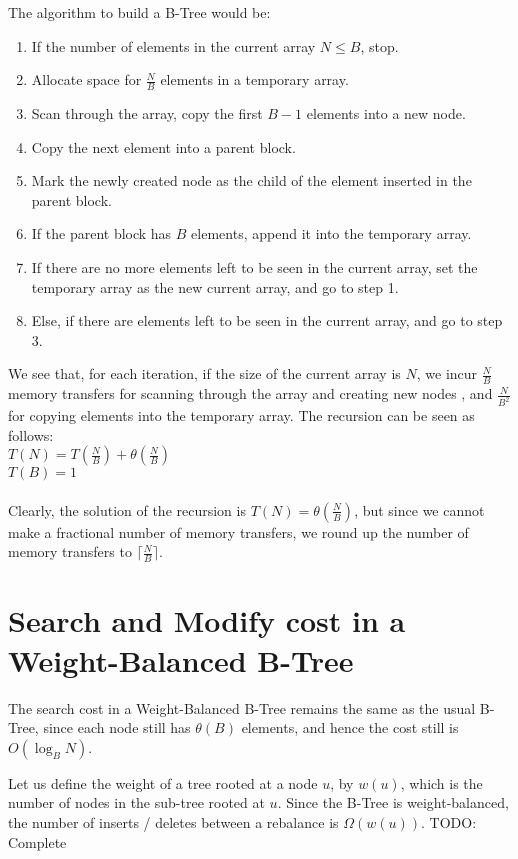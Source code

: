 \documentclass{article}
\begin{document}
The algorithm to build a B-Tree would be:
\begin{enumerate}
\item If the number of elements in the current array $N \leq B $, stop.
\item Allocate space for $\frac{N}{B}$ elements in a temporary array.
\item Scan through the array, copy the first $B-1$ elements into a new node.
\item Copy the next element into a parent block. 
\item Mark the newly created node as the child of the element inserted in the parent block.
\item If the parent block has $B$ elements, append it into the temporary array.
\item If there are no more elements left to be seen in the current array, set the temporary
array as the new current array, and go to step 1.
\item Else, if there are elements left to be seen in the current array, and go to step 3.
\end{enumerate}

We see that, for each iteration, if the size of the current array is $N$, we incur
$\frac{N}{B}$ memory transfers for scanning through the array and creating new nodes
, and $\frac{N}{B^2}$ for copying elements into the temporary array. The recursion
can be seen as follows:\\

$T(N) = T(\frac{N}{B}) + \theta(\frac{N}{B})$ \\
$T(B) = 1$\\
\\
Clearly, the solution of the recursion is $T(N) = \theta(\frac{N}{B})$, but since we cannot
make a fractional number of memory transfers, we round up the number of memory transfers
to $\lceil \frac{N}{B} \rceil$.

\clearpage

\clearpage

\section {Search and Modify cost in a Weight-Balanced B-Tree}
The search cost in a Weight-Balanced B-Tree remains the same as the usual
B-Tree, since each node still has $\theta(B)$ elements, and hence the cost still is
$O(\log_B{N})$.

Let us define the weight of a tree rooted at a node $u$, by $w(u)$, which is the
number of nodes in the sub-tree rooted at $u$. Since the B-Tree is weight-balanced,
the number of inserts / deletes between a rebalance is $\Omega(w(u))$.
TODO: Complete
\clearpage
\end{document}
